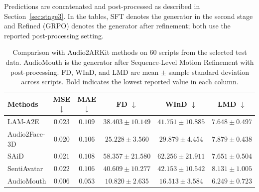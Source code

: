 Predictions are concatenated and post-processed as described in Section~\ref{sec:stage3}. In the tables, SFT denotes the generator in the second stage and Refined (GRPO) denotes the generator after refinement; both use the reported post-processing setting.

\begin{table}[t]
\centering
{\fontsize{9}{10.5}\selectfont
\renewcommand{\arraystretch}{1.02}
\begin{tabular*}{\textwidth}{
    @{\extracolsep{\fill}} lccccc @{}
}
\hline
\textbf{Methods}
& \textbf{MSE $\downarrow$}
& \textbf{MAE $\downarrow$}
& \textbf{FD $\downarrow$}
& \textbf{WInD $\downarrow$}
& \textbf{LMD $\downarrow$} \\
\hline

LAM-A2E
& $0.023$
& $0.109$
& $38.403 \pm 10.149$
& $41.751 \pm 10.885$
& $7.648 \pm 0.497$ \\

Audio2Face-3D
& $0.020$
& $0.106$
& $25.228 \pm 3.560$
& $29.879 \pm 4.454$
& $7.879 \pm 0.438$ \\

SAiD
& $0.021$
& $0.108$
& $58.357 \pm 21.580$
& $62.256 \pm 21.911$
& $7.651 \pm 0.504$ \\

SentiAvatar
& $0.022$
& $0.106$
& $40.609 \pm 10.277$
& $42.153 \pm 10.542$
& $8.131 \pm 1.005$ \\

AudioMouth
& $\mathbf{0.006}$
& $\mathbf{0.053}$
& $\mathbf{10.820 \pm 2.635}$
& $\mathbf{16.513 \pm 3.584}$
& $\mathbf{6.249 \pm 0.723}$ \\
\hline
\end{tabular*}
}
\caption{Comparison with Audio2ARKit methods on 60 scripts from the selected test data. AudioMouth is the generator after Sequence-Level Motion Refinement with post-processing. FD, WInD, and LMD are mean $\pm$ sample standard deviation across scripts. Bold indicates the lowest reported value in each column.}
\label{tab:quantitative_results}
\end{table}

